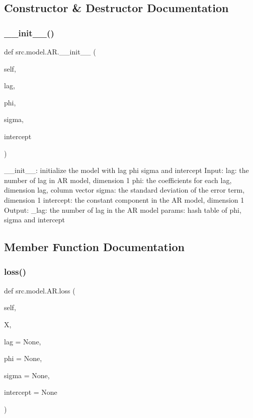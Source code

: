\subsection{Constructor \& Destructor Documentation}
\mbox{\label{classsrc_1_1model_1_1AR_a943f799da7cba763b29778ba12481c64}} 
\subsubsection{\texorpdfstring{\+\_\+\+\_\+init\+\_\+\+\_\+()}{\_\_init\_\_()}}
{\footnotesize\ttfamily def src.\+model.\+A\+R.\+\_\+\+\_\+init\+\_\+\+\_\+ (\begin{DoxyParamCaption}\item[{}]{self,  }\item[{}]{lag,  }\item[{}]{phi,  }\item[{}]{sigma,  }\item[{}]{intercept }\end{DoxyParamCaption})}

\begin{DoxyVerb}__init__: initialize the model with lag phi sigma and intercept
   Input: 
 lag: the number of lag in AR model, dimension 1
 phi: the coefficients for each lag, dimension lag, column vector
 sigma: the standard deviation of the error term, dimension 1
 intercept: the constant component in the AR model, dimension 1
   Output:
 _lag: the number of lag in the AR model
 params: hash table of phi, sigma and intercept\end{DoxyVerb}
 

\subsection{Member Function Documentation}
\mbox{\label{classsrc_1_1model_1_1AR_ae6095b1c295bdbd6dddd0b1fa87948ef}} 
\subsubsection{\texorpdfstring{loss()}{loss()}}
{\footnotesize\ttfamily def src.\+model.\+A\+R.\+loss (\begin{DoxyParamCaption}\item[{}]{self,  }\item[{}]{X,  }\item[{}]{lag = {\ttfamily None},  }\item[{}]{phi = {\ttfamily None},  }\item[{}]{sigma = {\ttfamily None},  }\item[{}]{intercept = {\ttfamily None} }\end{DoxyParamCaption})}

